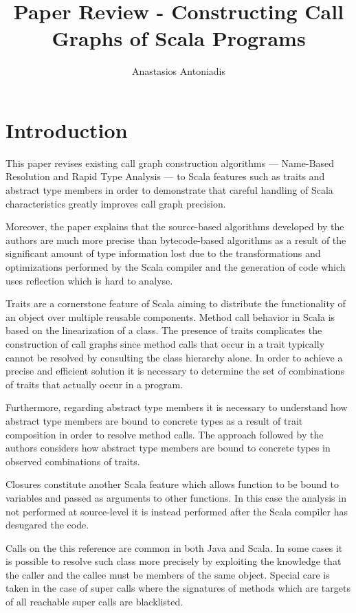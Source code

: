 \documentclass{article} \usepackage{hyperref} \usepackage{graphicx}
\begin{document}
\title{Paper Review - Constructing Call Graphs of Scala Programs}
\author{Anastasios Antoniadis}

\maketitle

\section{Introduction}

This paper revises existing call graph construction algorithms ---
Name-Based Resolution and Rapid Type Analysis --- to Scala features
such as traits and abstract type members in order to demonstrate that
careful handling of Scala characteristics greatly improves call graph
precision.

Moreover, the paper explains that the source-based algorithms
developed by the authors are much more precise than bytecode-based
algorithms as a result of the significant amount of type information
lost due to the transformations and optimizations performed by the
Scala compiler and the generation of code which uses reflection which
is hard to analyse.

Traits are a cornerstone feature of Scala aiming to distribute the
functionality of an object over multiple reusable components. Method
call behavior in Scala is based on the linearization of a class. The
presence of traits complicates the construction of call graphs since
method calls that occur in a trait typically cannot be resolved by
consulting the class hierarchy alone. In order to achieve a precise
and efficient solution it is necessary to determine the set of
combinations of traits that actually occur in a program.

Furthermore, regarding abstract type members it is necessary to
understand how abstract type members are bound to concrete types as a
result of trait composition in order to resolve method calls. The
approach followed by the authors considers how abstract type members
are bound to concrete types in observed combinations of traits.

Closures constitute another Scala feature which allows function to be
bound to variables and passed as arguments to other functions. In this
case the analysis in not performed at source-level it is instead
performed after the Scala compiler has desugared the code.

Calls on the this reference are common in both Java and Scala. In some
cases it is possible to resolve such class more precisely by
exploiting the knowledge that the caller and the callee must be
members of the same object. Special care is taken in the case of super
calls where the signatures of methods which are targets of all
reachable super calls are blacklisted.
\end{document}
